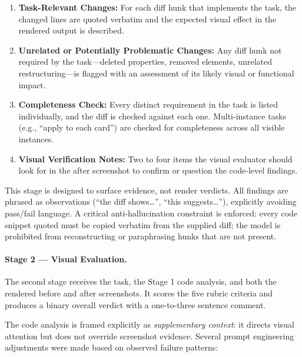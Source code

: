 \documentclass[sigconf,nonacm]{acmart}
\begin{document}
\begin{enumerate}[noitemsep]
  \item \textbf{Task-Relevant Changes:} For each diff hunk that implements the task, the changed lines are quoted verbatim and the expected visual effect in the rendered output is described.
  \item \textbf{Unrelated or Potentially Problematic Changes:} Any diff hunk not required by the task—deleted properties, removed elements, unrelated restructuring—is flagged with an assessment of its likely visual or functional impact.
  \item \textbf{Completeness Check:} Every distinct requirement in the task is listed individually, and the diff is checked against each one. Multi-instance tasks (e.g., ``apply to each card'') are checked for completeness across all visible instances.
  \item \textbf{Visual Verification Notes:} Two to four items the visual evaluator should look for in the after screenshot to confirm or question the code-level findings.
\end{enumerate}

This stage is designed to surface evidence, not render verdicts. All findings are phrased as observations (``the diff shows\ldots'', ``this suggests\ldots''), explicitly avoiding pass/fail language. A critical anti-hallucination constraint is enforced: every code snippet quoted must be copied verbatim from the supplied diff; the model is prohibited from reconstructing or paraphrasing hunks that are not present.

\paragraph{Stage 2 — Visual Evaluation.}
The second stage receives the task, the Stage 1 code analysis, and both the rendered before and after screenshots. It scores the five rubric criteria and produces a binary overall verdict with a one-to-three sentence comment.

The code analysis is framed explicitly as \emph{supplementary context}: it directs visual attention but does not override screenshot evidence. Several prompt engineering adjustments were made based on observed failure patterns:
\end{document}
